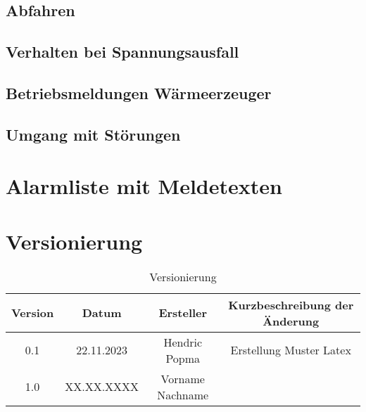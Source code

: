 \section{Abfahren}
\label{sec:abfahren}

\section{Verhalten bei Spannungsausfall}

\section{Betriebsmeldungen Wärmeerzeuger}

\section{Umgang mit Störungen}


\chapter{Alarmliste mit Meldetexten}

\chapter{Versionierung}
\begin{table}[H]
	\renewcommand{\arraystretch}{1.3}
	\centering
	\begin{tabular}{|c|c|c|c|} \hline 
		\textbf{Version} & \textbf{Datum} & \textbf{Ersteller} & \textbf{Kurzbeschreibung der Änderung} \\\hline
		0.1 & 22.11.2023 & Hendric Popma & Erstellung Muster Latex \\\hline
		1.0 & XX.XX.XXXX & Vorname Nachname & \\\hline
	\end{tabular}
	\caption{Versionierung}
	\label{tab:versionierung}
\end{table}
